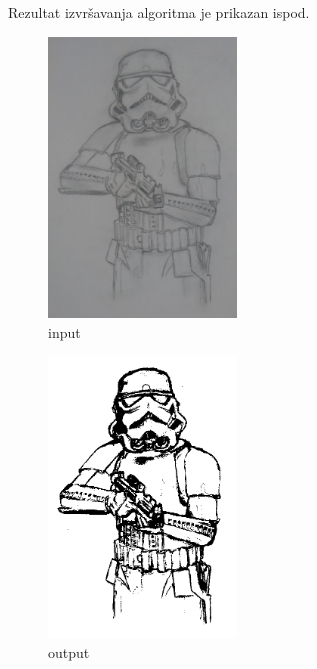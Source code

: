 \documentclass[12pt,a4paper]{article}
\theoremstyle{definition}
\theoremstyle{remark}
\theoremstyle{plain}
\begin{document}
Rezultat izvr\v savanja algoritma je prikazan ispod.
\begin{multicols}{2}
\begin{figure}[H]
\centering
\includegraphics[width=5cm]{codes/images/storm_trooper.jpg}
  \caption{input}
\end{figure}
\columnbreak
\begin{figure}[H]
\centering
\includegraphics[width=5cm]{codes/images/storm_trooper_binarized.png}
  \caption{output}
\end{figure}
\end{multicols}
\end{document}
